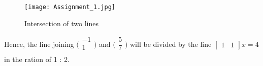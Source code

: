 \documentclass[10pt, twocolumn]{article}
\begin{document}
\begin{center}
	\begin{figure}[htb!]
		\centering
		\texttt{[image: Assignment\_1.jpg]}
		\caption{Intersection of two lines}
		\label{fig1}
	\end{figure}
\end{center}
Hence, the  line joining  $ \bigl(\begin{smallmatrix}
-1\\ 
1 \\
\end{smallmatrix}\bigr)$ and $ \bigl(\begin{smallmatrix}
5\\ 
7 \\
\end{smallmatrix}\bigr) $ will be  divided by the line $ \begin{bmatrix}
1 &  1
\end{bmatrix}x = 4$ in the ration of 1 : 2.
\end{document}
